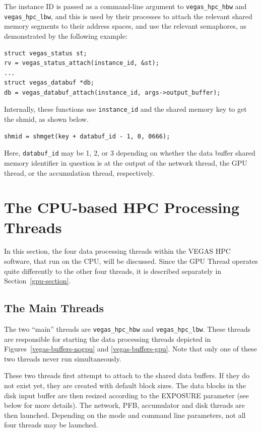 \documentclass[11pt]{article} %
\begin{document}
The instance ID is passed as a command-line argument to {\tt vegas\_hpc\_hbw}
and {\tt vegas\_hpc\_lbw}, and this is used by their processes to attach the
relevant shared memory segments to their address spaces, and use the relevant
semaphores, as demonstrated by the following example:

\begin{verbatim}
struct vegas_status st;
rv = vegas_status_attach(instance_id, &st);
...
struct vegas_databuf *db;
db = vegas_databuf_attach(instance_id, args->output_buffer);
\end{verbatim}

Internally, these functions use {\tt instance\_id} and the shared memory key to
get the shmid, as shown below.

\begin{verbatim}
shmid = shmget(key + databuf_id - 1, 0, 0666);
\end{verbatim}

Here, {\tt databuf\_id} may be 1, 2, or 3 depending on whether the data buffer
shared memory identifier in question is at the output of the network thread,
the GPU thread, or the accumulation thread, respectively.



\clearpage
\section{The CPU-based HPC Processing Threads}

In this section, the four data processing threads within the VEGAS HPC software, that run on the CPU, will be discussed. Since the GPU Thread operates quite differently to the other four threads, it is described separately in Section~\ref{gpu-section}.

\subsection{The Main Threads}
The two ``main'' threads are \texttt{vegas\_hpc\_hbw} and \texttt{vegas\_hpc\_lbw}. These threads are responsible for starting the data processing threads depicted in Figures~\ref{vegas-buffers-nogpu} and \ref{vegas-buffers-gpu}. Note that only one of these two threads never run simultaneously.

These two threads first attempt to attach to the shared data buffers. If they do not exist yet, they are created with default block sizes. The data blocks in the disk input buffer are then resized according to the EXPOSURE parameter (see below for more details). The network, PFB, accumulator and disk threads are then launched. Depending on the mode and command line parameters, not all four threads may be launched.
\end{document}
